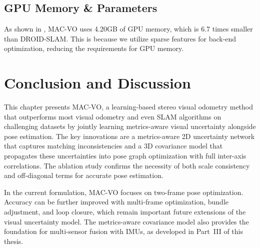 \subsection{GPU Memory \& Parameters}

As shown in , MAC-VO uses 4.20GB of GPU memory, which is 6.7 times smaller than DROID-SLAM.
This is because we utilize sparse features for back-end optimization, reducing the requirements for GPU memory.

\begin{table}[t]
\centering
\caption{The GPU memory consumption and the number of parameters during testing.}
\vspace{2mm}
\label{table:memory}
\end{table}


\section{Conclusion and Discussion}
\label{sec:macvo_conclusion}

This chapter presents MAC-VO, a learning-based stereo visual odometry method that outperforms most visual odometry and even SLAM algorithms on challenging datasets by jointly learning metrics-aware visual uncertainty alongside pose estimation.
The key innovations are a metrics-aware 2D uncertainty network that captures matching inconsistencies and a 3D covariance model that propagates these uncertainties into pose graph optimization with full inter-axis correlations.
The ablation study confirms the necessity of both scale consistency and off-diagonal terms for accurate pose estimation.

In the current formulation, MAC-VO focuses on two-frame pose optimization.
Accuracy can be further improved with multi-frame optimization, bundle adjustment, and loop closure, which remain important future extensions of the visual uncertainty model.
The metrics-aware covariance model also provides the foundation for multi-sensor fusion with IMUs, as developed in Part~III of this thesis.


